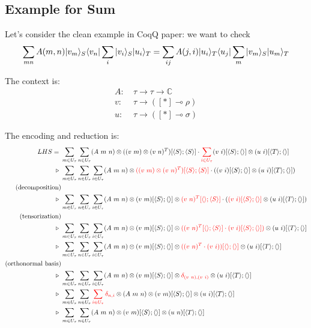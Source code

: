 \subsection{Example for Sum}
Let's consider the clean example in CoqQ paper: we want to check
$$
\sum_{mn}A(m,n)|v_m\rangle_S\langle v_n|\sum_i|v_i\rangle_S|u_i\rangle_T
= \sum_{ij}A(j, i) |u_i\rangle_T\langle u_j|\sum_m|v_m\rangle_S|u_m\rangle_T
$$

The context is:
\begin{align*}
  A :\ & \tau \to \tau \to \mathbb{C}\\
  v :\ & \tau \to ([*] \multimap \rho)\\
  u :\ & \tau \to ([*] \multimap \sigma)
\end{align*}

The encoding and reduction is:
\begin{align*}
  LHS =\ & \sum_{m \in U_\tau} \sum_{n \in U_\tau} (A\ m\ n) \otimes ((v\ m) \otimes (v\ n)^T)[\<S\>; \<S\>] \cdot \textcolor{red}{\sum_{i \in U_\tau}} (v\ i)[\<S\>; \<\>] \otimes (u\ i)[\<T\>; \<\>] \\
  \triangleright\ & \sum_{m \in U_\tau} \sum_{n \in U_\tau}\sum_{i \in U_\tau} (A\ m\ n) \otimes \textcolor{red}{((v\ m) \otimes (v\ n)^T)[\<S\>; \<S\>]} \cdot \left ( (v\ i)[\<S\>; \<\>] \otimes (u\ i)[\<T\>; \<\>] \right ) \\
   \text{(decomposition)} &\\
  \triangleright\ & \sum_{m \in U_\tau} \sum_{n \in U_\tau} \sum_{i \in U_\tau} (A\ m\ n) \otimes (v\ m)[\<S\>; \<\>] \otimes \textcolor{red}{(v\ n)^T[\<\>; \<S\>]} \cdot ( \textcolor{red}{(v\ i)[\<S\>; \<\>]} \otimes (u\ i)[\<T\>; \<\>]) \\
  \text{(tensorization)} &\\
  \triangleright\ & \sum_{m \in U_\tau} \sum_{n \in U_\tau} \sum_{i \in U_\tau} (A\ m\ n) \otimes (v\ m)[\<S\>; \<\>] \otimes \textcolor{red}{((v\ n)^T[\<\>; \<S\>] \cdot (v\ i)[\<S\>; \<\>])} \otimes (u\ i)[\<T\>; \<\>] \\
  \triangleright\ & \sum_{m \in U_\tau} \sum_{n \in U_\tau} \sum_{i \in U_\tau} (A\ m\ n) \otimes (v\ m)[\<S\>; \<\>] \otimes \textcolor{red}{((v\ n)^T \cdot (v\ i))[\<\>; \<\>]} \otimes (u\ i)[\<T\>; \<\>] \\
  \text{(orthonormal basis)} \\
  \triangleright\ & \sum_{m \in U_\tau} \sum_{n \in U_\tau} \sum_{i \in U_\tau} (A\ m\ n) \otimes (v\ m)[\<S\>; \<\>] \otimes \textcolor{red}{\delta_{(v\ n), (v\ i)}} \otimes (u\ i)[\<T\>; \<\>] \\
  \triangleright\ & \sum_{m \in U_\tau} \sum_{n \in U_\tau} \textcolor{red}{\sum_{i \in U_\tau} \delta_{n, i}} \otimes (A\ m\ n) \otimes (v\ m)[\<S\>; \<\>] \otimes (u\ i)[\<T\>; \<\>] \\
  \triangleright\ & \sum_{m \in U_\tau} \sum_{n \in U_\tau} (A\ m\ n) \otimes (v\ m)[\<S\>; \<\>] \otimes (u\ n)[\<T\>; \<\>]
\end{align*}

